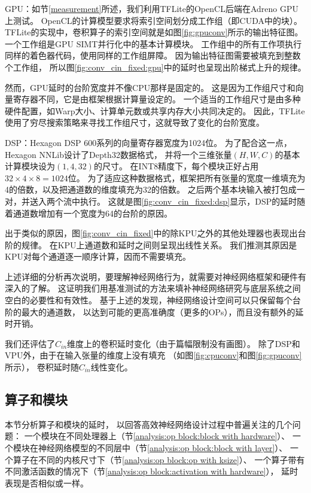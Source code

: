 GPU：如节\ref{measurement}所述，我们利用TFLite的OpenCL后端在Adreno GPU上测试。
OpenCL的计算模型要求将索引空间划分成工作组（即CUDA中的块）\cite{lee2019device}。
TFLite的实现中，卷积算子的索引空间就是如图\ref{fig:gpuconv}所示的输出特征图。
一个工作组是GPU SIMT并行化中的基本计算模块。
工作组中的所有工作项执行同样的着色器代码，使用同样的工作组屏障。
因为输出特征图需要被填充到整数个工作组，
所以图\ref{fig:conv_cin_fixed:gpu}中的延时也呈现出阶梯式上升的规律。

然而，GPU延时的台阶宽度并不像CPU那样是固定的。
这是因为工作组尺寸和向量寄存器不同，它是由框架根据计算量设定的。
一个适当的工作组尺寸是由多种硬件配置，如Warp大小、计算单元数或共享内存大小共同决定的。
因此，TFLite使用了穷尽搜索策略来寻找工作组尺寸，这就导致了变化的台阶宽度。

DSP：Hexagon DSP 600系列的向量寄存器宽度为1024位。
为了配合这一点，Hexagon NNLib设计了Depth32\cite{nnlib}数据格式，
并将一个三维张量$(H,W,C)$的基本计算模块设为$(1,4,32)$的尺寸。
在INT8精度下，每个模块正好占用$32\times 4\times 8=1024$位。
为了适应这种数据格式，框架把所有张量的宽度一维填充为4的倍数，以及把通道数的维度填充为32的倍数。
之后两个基本块输入被打包成一对，并送入两个流中执行。
这就是图\ref{fig:conv_cin_fixed:dsp}显示，DSP的延时随着通道数增加有一个宽度为64的台阶的原因。

出于类似的原因，图\ref{fig:conv_cin_fixed}中的除KPU之外的其他处理器也表现出台阶的规律。
在KPU上通道数和延时之间则呈现出线性关系。
我们推测其原因是KPU对每个通道逐一顺序计算，因而不需要填充。

上述详细的分析再次说明，要理解神经网络行为，就需要对神经网络框架和硬件有深入的了解。
这证明我们用基准测试的方法来填补神经网络研究与底层系统之间空白的必要性和有效性。
基于上述的发现，神经网络设计空间可以只保留每个台阶的最大的通道数，
以达到可能的更高准确度（更多的OPs），而且没有额外的延时开销。

我们还评估了$C_{in}$维度上的卷积延时变化（由于篇幅限制没有画图）。
除了DSP和VPU外，由于在输入张量的维度上没有填充
（如图\ref{fig:cpuconv}和图\ref{fig:gpuconv}所示），
卷积延时随$C_{in}$线性变化。

\subsection{算子和模块}
\label{analysis:op block}
本节分析算子和模块的延时，
以回答高效神经网络设计过程中普遍关注的几个问题：
一个模块在不同处理器上（节\ref{analysis:op block:block with hardware}）、
一个模块在神经网络模型的不同层中（节\ref{analysis:op block:block with layer}）、
一个算子在不同的内核尺寸下（节\ref{analysis:op block:op with ksize}）、
一个算子带有不同激活函数的情况下（节\ref{analysis:op block:activation with hardware}），
延时表现是否相似或一样。

